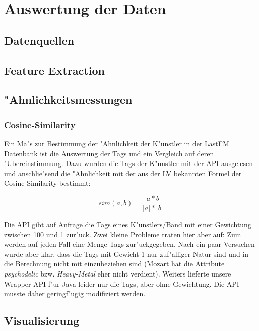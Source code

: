 \section{Auswertung der Daten}


\subsection{Datenquellen}


\subsection{Feature Extraction}


\subsection{"Ahnlichkeitsmessungen}
\subsubsection{Cosine-Similarity}
Ein Ma"s zur Bestimmung der "Ahnlichkeit der K"unstler in der LastFM Datenbank ist die Auswertung der Tags und ein Vergleich auf deren "Ubereinstimmung.
Dazu wurden die Tags der K"unstler mit der API ausgelesen und anschlie"send die "Ahnlichkeit mit der aus der LV bekannten Formel der Cosine Similarity bestimmt:

\begin{equation}
sim(a,b) = \frac{a*b}{\left|a\right|*\left|b\right|}
\end{equation}

Die API gibt auf Anfrage die Tags eines K"unstlers/Band mit einer Gewichtung zwischen 100 und 1 zur"uck. Zwei kleine Probleme traten hier aber auf: Zum werden auf jeden Fall eine Menge Tags zur"uckgegeben. Nach ein paar Versuchen wurde aber klar, dass die Tags mit Gewicht 1 nur zuf"alliger Natur sind und in die Berechnung nicht mit einzubeziehen sind (Mozart hat die Attribute \textit{psychodelic} bzw. \textit{Heavy-Metal} eher nicht verdient). Weiters lieferte unsere Wrapper-API f"ur Java leider nur die Tags, aber ohne Gewichtung. Die API musste daher geringf"ugig modifiziert werden.

\subsection{Visualisierung}

